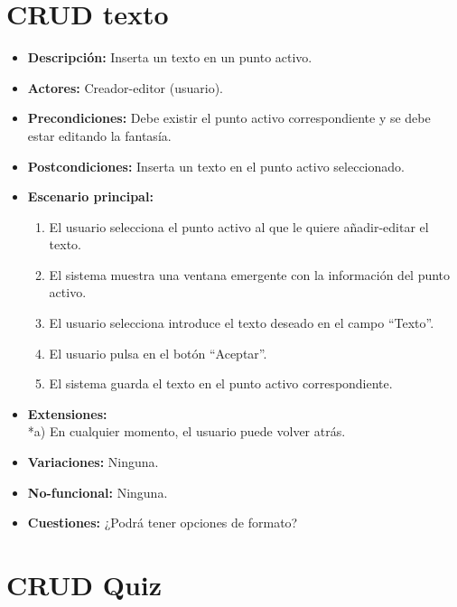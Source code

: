 \documentclass[12pt,letterpaper]{article}
\begin{document}
\section{CRUD texto}
\begin{itemize}
	\item \textbf{Descripción:} Inserta un texto en un punto activo.
	\item \textbf{Actores:} Creador-editor (usuario).
	\item \textbf{Precondiciones:} Debe existir el punto activo correspondiente y se debe estar editando la fantasía.
	\item \textbf{Postcondiciones:} Inserta un texto en el punto activo seleccionado.
	\item \textbf{Escenario principal:}
	\begin{enumerate}
		\item El usuario selecciona el punto activo al que le quiere añadir-editar el texto.
		\item El sistema muestra una ventana emergente con la información del punto activo.
		\item El usuario selecciona introduce el texto deseado en el campo ``Texto''. 
		\item El usuario pulsa en el botón ``Aceptar''.
		\item El sistema guarda el texto en el punto activo correspondiente.
	\end{enumerate}
	\item \textbf{Extensiones:} \\ *a) En cualquier momento, el usuario puede volver atrás.
	\item \textbf{Variaciones:} Ninguna.
	\item \textbf{No-funcional:} Ninguna.
	\item \textbf{Cuestiones:} ¿Podrá tener opciones de formato?
\end{itemize}

\section{CRUD Quiz}
\hypertarget{crearquiz}{}
\end{document}
